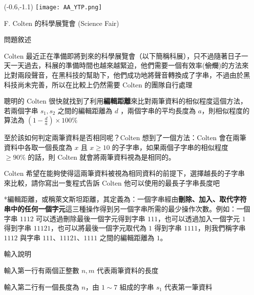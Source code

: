 \documentclass[12pt]{article}
\newcommand{\ProblemTitleFont}{\ProblemTitleMainFont\ProblemTitleCJKFont}
\newcommand{\ProblemTitle}[2]{\noindent\Large{\ProblemTitleFont #1 (#2)}\normalsize\par}
\newcommand{\ProblemSection}[1]{\vspace{0.6cm}\par\noindent\large{\ProblemTitleFont #1}\normalsize\par}
\newcommand{\ProblemStatement}{\ProblemSection{問題敘述}}
\newcommand{\ProblemInput}{\ProblemSection{輸入說明}}
\begin{document}

\begin{textblock}{0.1}(-0.6,-1.1)
	\texttt{[image: AA\_YTP.png]}
\end{textblock}




\renewcommand{\headrulewidth}{0pt}
\renewcommand{\baselinestretch}{1.3}
\setlength\parindent{24pt}
\setlength\parskip{12pt}
\cfoot{\thepage}

\ProblemTitle{F. Colten 的科學展覽會}{Science Fair}

\ProblemStatement

Colten 最近正在準備即將到來的科學展覽會（以下簡稱科展），只不過隨著日子一天一天過去，科展的準備時間也越來越緊迫，他們需要一個有效率(\sout{偷爛})的方法來比對兩段聲音，在黑科技的幫助下，他們成功地將聲音轉換成了字串，不過由於黑科技尚未完善，所以在比較上仍然需要 Colten 的團隊自行處理


聰明的 Colten 很快就找到了利用\textbf{編輯距離}來比對兩筆資料的相似程度這個方法，若兩個字串 $s_1,s_2$ 之間的編輯距離為 $d$ ，兩個字串的平均長度為 $a$，則相似程度的算法為 $(1-\frac{d}{a}) \times 100\%$

至於該如何判定兩筆資料是否相同呢？Colten 想到了一個方法：Colten 會在兩筆資料中各取一個長度為 $x$ 且 $x \ge 10$ 的子字串，如果兩個子字串的相似程度 $\ge 90\%$ 的話，則 Colten 就會將兩筆資料視為是相同的。 

Colten 希望在能夠使得這兩筆資料被視為相同資料的前提下，選擇越長的子字串來比較，請你寫出一隻程式告訴 Colten 他可以使用的最長子字串長度吧

*編輯距離，或稱萊文斯坦距離，其定義為：一個字串經由\textbf{刪除、加入、取代字符串中的任何一個字元}這三種操作得到另一個字串所需的最少操作次數。例如：一個字串 $1112$ 可以透過刪除最後一個字元得到字串 $111$，也可以透過加入一個字元 $1$ 得到字串 $11121$，也可以將最後一個字元取代為 $1$ 得到字串 $1111$，則我們稱字串 $1112$ 與字串 $111$、$11121$、$1111$ 之間的編輯距離為 $1$。

\ProblemInput

輸入第一行有兩個正整數 $n,m$ 代表兩筆資料的長度

輸入第二行有一個長度為 $n$，由 $1\sim7$ 組成的字串 $s_1$ 代表第一筆資料
\end{document}
